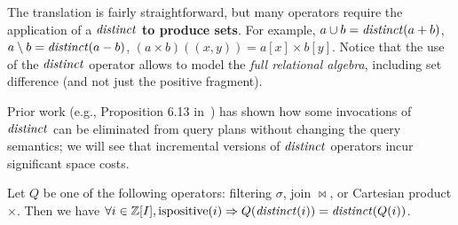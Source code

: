 The translation is fairly straightforward, but many operators require
the application of a $\mathit{distinct}$ \textbf{to produce sets}.
For example, $a \cup b = \mathit{distinct}(a + b)$, $a \setminus b =
\mathit{distinct}(a - b)$, $(a \times b)((x,y)) = a[x] \times b[y]$.
%
%
%
%
%
%
%
Notice that the use of the $\mathit{distinct}$ operator allows \dbsp to model
the \emph{full relational algebra}, including set difference (and not
just the positive fragment).

Prior work (e.g., Proposition 6.13 in~\cite{green-tcs11}) has shown
how some invocations of $\mathit{distinct}$ can be eliminated from query plans
without changing the query semantics; we will see that incremental
versions of $\mathit{distinct}$ operators incur significant space costs.

\begin{proposition}\label{prop-distinct-delay}
Let $Q$ be one of the following \zrs operators: filtering $\sigma$,
join $\bowtie$, or Cartesian product $\times$.
Then we have $\forall i \in \mathbb{Z}[I], \mbox{ispositive}(i) \Rightarrow Q(\mathit{distinct}(i)) = \mathit{distinct}(Q(i))$.
\end{proposition}

